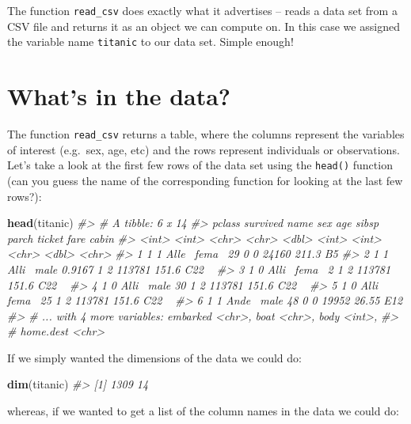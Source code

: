 \documentclass[]{book}
\newenvironment{Shaded}{\begin{snugshade}}{\end{snugshade}}
\newcommand{\CommentTok}[1]{\textcolor[rgb]{0.56,0.35,0.01}{\textit{#1}}}
\newcommand{\KeywordTok}[1]{\textcolor[rgb]{0.13,0.29,0.53}{\textbf{#1}}}
\newcommand{\NormalTok}[1]{#1}
\theoremstyle{definition}
\theoremstyle{definition}
\theoremstyle{definition}
\theoremstyle{remark}
\begin{document}
The function \texttt{read\_csv} does exactly what it advertises -- reads
a data set from a CSV file and returns it as an object we can compute
on. In this case we assigned the variable name \texttt{titanic} to our
data set. Simple enough!

\hypertarget{whats-in-the-data}{%
\section{What's in the data?}\label{whats-in-the-data}}

The function \texttt{read\_csv} returns a table, where the columns
represent the variables of interest (e.g.~sex, age, etc) and the rows
represent individuals or observations. Let's take a look at the first
few rows of the data set using the \texttt{head()} function (can you
guess the name of the corresponding function for looking at the last few
rows?):

\begin{Shaded}
\begin{Highlighting}[]
\KeywordTok{head}\NormalTok{(titanic)}
\CommentTok{#> # A tibble: 6 x 14}
\CommentTok{#>   pclass survived name  sex       age sibsp parch ticket   fare cabin}
\CommentTok{#>    <int>    <int> <chr> <chr>   <dbl> <int> <int> <chr>   <dbl> <chr>}
\CommentTok{#> 1      1        1 Alle~ fema~ 29          0     0 24160  211.3  B5   }
\CommentTok{#> 2      1        1 Alli~ male   0.9167     1     2 113781 151.6  C22 ~}
\CommentTok{#> 3      1        0 Alli~ fema~  2          1     2 113781 151.6  C22 ~}
\CommentTok{#> 4      1        0 Alli~ male  30          1     2 113781 151.6  C22 ~}
\CommentTok{#> 5      1        0 Alli~ fema~ 25          1     2 113781 151.6  C22 ~}
\CommentTok{#> 6      1        1 Ande~ male  48          0     0 19952   26.55 E12  }
\CommentTok{#> # ... with 4 more variables: embarked <chr>, boat <chr>, body <int>,}
\CommentTok{#> #   home.dest <chr>}
\end{Highlighting}
\end{Shaded}

If we simply wanted the dimensions of the data we could do:

\begin{Shaded}
\begin{Highlighting}[]
\KeywordTok{dim}\NormalTok{(titanic)}
\CommentTok{#> [1] 1309   14}
\end{Highlighting}
\end{Shaded}

whereas, if we wanted to get a list of the column names in the data we
could do:
\end{document}
